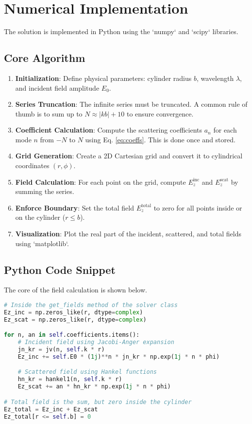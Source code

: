 \documentclass[11pt,a4paper]{article}
\begin{document}
\section{Numerical Implementation}

The solution is implemented in Python using the `numpy` and `scipy` libraries.

\subsection{Core Algorithm}
\begin{enumerate}
    \item \textbf{Initialization}: Define physical parameters: cylinder radius $b$, wavelength $\lambda$, and incident field amplitude $E_0$.
    \item \textbf{Series Truncation}: The infinite series must be truncated. A common rule of thumb is to sum up to $N \approx |kb| + 10$ to ensure convergence.
    \item \textbf{Coefficient Calculation}: Compute the scattering coefficients $a_n$ for each mode $n$ from $-N$ to $N$ using Eq. \ref{eq:coeffs}. This is done once and stored.
    \item \textbf{Grid Generation}: Create a 2D Cartesian grid and convert it to cylindrical coordinates $(r, \phi)$.
    \item \textbf{Field Calculation}: For each point on the grid, compute $E_z^{\text{inc}}$ and $E_z^{\text{scat}}$ by summing the series.
    \item \textbf{Enforce Boundary}: Set the total field $E_z^{\text{total}}$ to zero for all points inside or on the cylinder ($r \le b$).
    \item \textbf{Visualization}: Plot the real part of the incident, scattered, and total fields using `matplotlib`.
\end{enumerate}

\subsection{Python Code Snippet}
The core of the field calculation is shown below.
\begin{lstlisting}[language=Python, caption=Field Calculation Loop]
# Inside the get_fields method of the solver class
Ez_inc = np.zeros_like(r, dtype=complex)
Ez_scat = np.zeros_like(r, dtype=complex)

for n, an in self.coefficients.items():
    # Incident field using Jacobi-Anger expansion
    jn_kr = jv(n, self.k * r)
    Ez_inc += self.E0 * (1j)**n * jn_kr * np.exp(1j * n * phi)

    # Scattered field using Hankel functions
    hn_kr = hankel1(n, self.k * r)
    Ez_scat += an * hn_kr * np.exp(1j * n * phi)

# Total field is the sum, but zero inside the cylinder
Ez_total = Ez_inc + Ez_scat
Ez_total[r <= self.b] = 0
\end{lstlisting}
\end{document}
